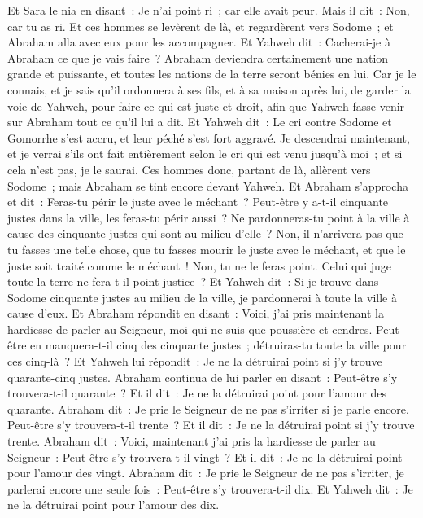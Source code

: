 \begin{multicols}{2}
Et Sara le nia en disant~: Je n'ai point ri~; car elle avait peur. Mais il dit~: Non, car tu as ri.
Et ces hommes se levèrent de là, et regardèrent vers Sodome~; et Abraham alla avec eux pour les accompagner.
Et Yahweh dit~: Cacherai-je à Abraham ce que je vais faire~?
Abraham deviendra certainement une nation grande et puissante, et toutes les nations de la terre seront bénies en lui.
Car je le connais, et je sais qu'il ordonnera à ses fils, et à sa maison après lui, de garder la voie de Yahweh, pour faire ce qui est juste et droit, afin que Yahweh fasse venir sur Abraham tout ce qu'il lui a dit.
Et Yahweh dit~: Le cri contre Sodome et Gomorrhe s'est accru, et leur péché s'est fort aggravé.
Je descendrai maintenant, et je verrai s'ils ont fait entièrement selon le cri qui est venu jusqu'à moi~; et si cela n'est pas, je le saurai.
Ces hommes donc, partant de là, allèrent vers Sodome~; mais Abraham se tint encore devant Yahweh.
Et Abraham s'approcha et dit~: Feras-tu périr le juste avec le méchant~?
Peut-être y a-t-il cinquante justes dans la ville, les feras-tu périr aussi~? Ne pardonneras-tu point à la ville à cause des cinquante justes qui sont au milieu d'elle~?
Non, il n'arrivera pas que tu fasses une telle chose, que tu fasses mourir le juste avec le méchant, et que le juste soit traité comme le méchant~! Non, tu ne le feras point. Celui qui juge toute la terre ne fera-t-il point justice~?
Et Yahweh dit~: Si je trouve dans Sodome cinquante justes au milieu de la ville, je pardonnerai à toute la ville à cause d'eux.
Et Abraham répondit en disant~: Voici, j'ai pris maintenant la hardiesse de parler au Seigneur, moi qui ne suis que poussière et cendres.
Peut-être en manquera-t-il cinq des cinquante justes~; détruiras-tu toute la ville pour ces cinq-là~? Et Yahweh lui répondit~: Je ne la détruirai point si j'y trouve quarante-cinq justes.
Abraham continua de lui parler en disant~: Peut-être s'y trouvera-t-il quarante~? Et il dit~: Je ne la détruirai point pour l'amour des quarante.
Abraham dit~: Je prie le Seigneur de ne pas s'irriter si je parle encore. Peut-être s'y trouvera-t-il trente~? Et il dit~: Je ne la détruirai point si j'y trouve trente.
Abraham dit~: Voici, maintenant j'ai pris la hardiesse de parler au Seigneur~: Peut-être s'y trouvera-t-il vingt~? Et il dit~: Je ne la détruirai point pour l'amour des vingt.
Abraham dit~: Je prie le Seigneur de ne pas s'irriter, je parlerai encore une seule fois~: Peut-être s'y trouvera-t-il dix. Et Yahweh dit~: Je ne la détruirai point pour l'amour des dix.

\end{multicols}

